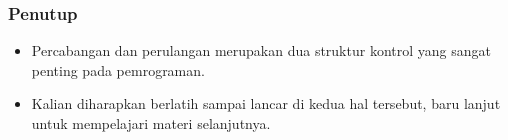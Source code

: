 \documentclass{beamer}
\begin{document}
\begin{frame}
\frametitle{Penutup}
\begin{itemize}
	\item Percabangan dan perulangan merupakan dua struktur kontrol yang sangat penting pada pemrograman.
	\item Kalian diharapkan berlatih sampai lancar di kedua hal tersebut, baru lanjut untuk mempelajari materi selanjutnya.
\end{itemize}
\end{frame}
\end{document}
